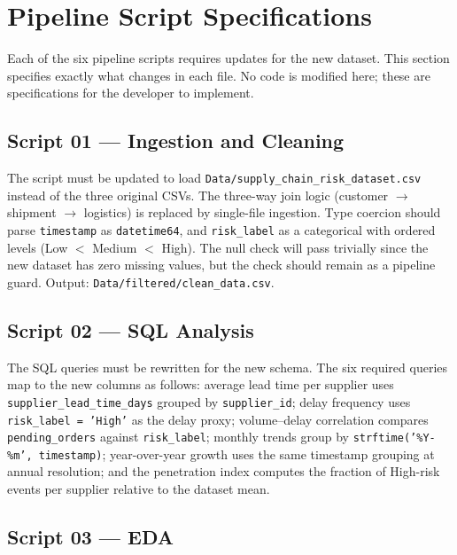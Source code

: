 \documentclass[11pt,a4paper]{article}
\begin{document}
\section{Pipeline Script Specifications}

Each of the six pipeline scripts requires updates for the new dataset. This section
specifies exactly what changes in each file. No code is modified here; these are
specifications for the developer to implement.

\subsection{Script 01 --- Ingestion and Cleaning}

The script must be updated to load \texttt{Data/supply\_chain\_risk\_dataset.csv}
instead of the three original CSVs. The three-way join logic (customer $\rightarrow$
shipment $\rightarrow$ logistics) is replaced by single-file ingestion. Type coercion
should parse \texttt{timestamp} as \texttt{datetime64}, and \texttt{risk\_label} as a
categorical with ordered levels (Low $<$ Medium $<$ High). The null check will pass
trivially since the new dataset has zero missing values, but the check should remain
as a pipeline guard. Output: \texttt{Data/filtered/clean\_data.csv}.

\subsection{Script 02 --- SQL Analysis}

The SQL queries must be rewritten for the new schema. The six required queries map to
the new columns as follows: average lead time per supplier uses
\texttt{supplier\_lead\_time\_days} grouped by \texttt{supplier\_id}; delay frequency
uses \texttt{risk\_label = 'High'} as the delay proxy; volume--delay correlation
compares \texttt{pending\_orders} against \texttt{risk\_label}; monthly trends group by
\texttt{strftime('\%Y-\%m', timestamp)}; year-over-year growth uses the same timestamp
grouping at annual resolution; and the penetration index computes the fraction of
High-risk events per supplier relative to the dataset mean.

\subsection{Script 03 --- EDA}
\end{document}

